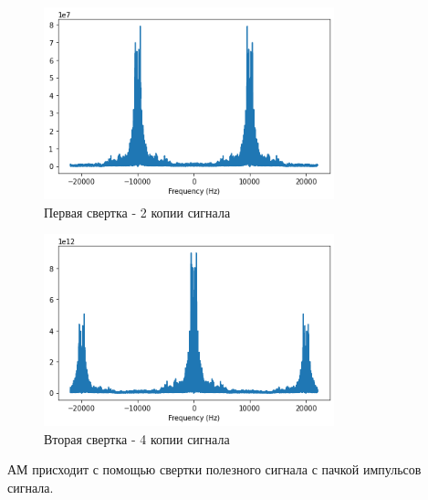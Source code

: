 \documentclass[a4paper, 12pt]{report}
\begin{document}
	\begin{figure}[H]
		\centering
		\includegraphics[width=0.75\textwidth]{am8.png}
		\caption{Первая свертка - 2 копии сигнала}
		\label{fig:am8}
	\end{figure}
	\begin{figure}[H]
		\centering
		\includegraphics[width=0.75\textwidth]{am9.png}
		\caption{Вторая свертка - 4 копии сигнала}
		\label{fig:am9}
	\end{figure}
	АМ присходит с помощью свертки полезного сигнала с пачкой импульсов  сигнала.
\end{document}
